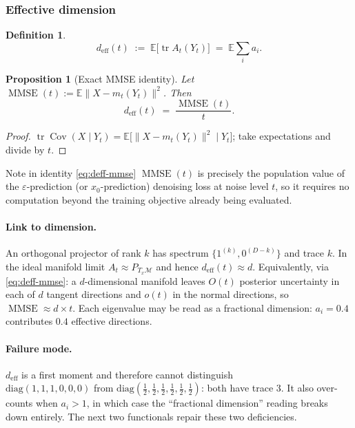 \documentclass{article}
\DeclareMathOperator{\Cov}{Cov}
\DeclareMathOperator{\tr}{tr}
\DeclareMathOperator{\mmse}{MMSE}
\newcommand{\E}{\mathbb{E}}
\newcommand{\M}{\mathcal{M}}
\newcommand{\deff}{d_{\mathrm{eff}}}
\theoremstyle{plain}
\newtheorem{proposition}[theorem]{Proposition}
\theoremstyle{definition}
\newtheorem{definition}[theorem]{Definition}
\theoremstyle{remark}
\begin{document}
\subsubsection{Effective dimension}

\begin{definition}
\begin{equation}
\deff(t) \;:=\; \E\bigl[\tr A_t(Y_t)\bigr] \;=\; \E\sum_{i} a_i .
\label{eq:deff}
\end{equation}
\end{definition}

\begin{proposition}[Exact MMSE identity]
\label{prop:deff-mmse}
Let $\mmse(t) := \E\bigl\lVert X - m_t(Y_t)\rVert^2$. Then
\begin{equation}
\deff(t) \;=\; \frac{\mmse(t)}{t}.
\label{eq:deff-mmse}
\end{equation}
\end{proposition}

\begin{proof}
$\tr\Cov(X\mid Y_t) = \E\bigl[\lVert X-m_t(Y_t)\rVert^2 \mid Y_t\bigr]$; take
expectations and divide by $t$.
\end{proof}

Note in identity \eqref{eq:deff-mmse} $\mmse(t)$ is precisely the population value of the
$\varepsilon$-prediction (or $x_0$-prediction) denoising loss at noise
level $t$, so it requires no computation beyond the training objective already being evaluated.

\paragraph{Link to dimension.}
An orthogonal projector of rank $k$ has spectrum
$\{1^{(k)},0^{(D-k)}\}$ and trace $k$. In the ideal manifold limit
$A_t\approx P_{T_x\M}$ and hence $\deff(t)\approx d$. Equivalently, via
\eqref{eq:deff-mmse}: a $d$-dimensional manifold leaves $O(t)$ posterior
uncertainty in each of $d$ tangent directions and $o(t)$ in the normal
directions, so $\mmse \approx d\times t$. Each eigenvalue may be read as a
fractional dimension: $a_i = 0.4$ contributes $0.4$ effective directions.

\paragraph{Failure mode.}
$\deff$ is a first moment and therefore cannot distinguish \\
$\mathrm{diag}(1,1,1,0,0,0)$ from $\mathrm{diag}(\tfrac12,\tfrac12,\tfrac12,\tfrac12,\tfrac12,\tfrac12)$:
both have trace $3$. It also over-counts when $a_i > 1$, in which case
the ``fractional dimension'' reading breaks down entirely. The next two
functionals repair these two deficiencies.
\end{document}
